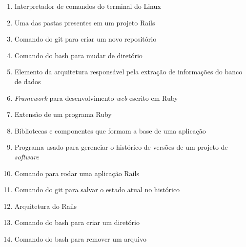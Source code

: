 \documentclass[a4paper,10pt]{article}
\begin{document}
\begin{multicols*}{2}
\begin{enumerate}
\begin{enumerate}[label=(\enumalphalphcnt*),start=27,itemsep=0em]
      \item Interpretador de comandos do terminal do Linux
      \item Uma das pastas presentes em um projeto Rails
      \item Comando do git para criar um novo repositório
      \item Comando do bash para mudar de diretório
      \item Elemento da arquitetura responsável pela extração de informações do banco de dados
      \item \textit{Framework} para desenvolvimento \textit{web} escrito em Ruby
      \item Extensão de um programa Ruby
      \item Bibliotecas e componentes que formam a base de uma aplicação
      \item Programa usado para gerenciar o histórico de versões de um projeto de \textit{software}
      \item Comando para rodar uma aplicação Rails
      \item Comando do git para salvar o estado atual no histórico
      \item Arquitetura do Rails
      \item Comando do bash para criar um diretório
      \item Comando do bash para remover um arquivo
    \end{enumerate}


\end{enumerate}
\end{multicols*}
\end{document}
